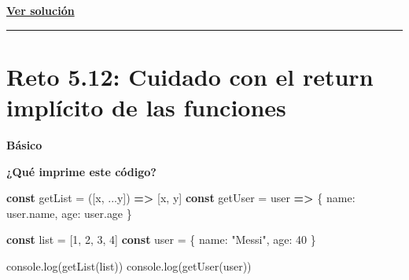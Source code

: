 \documentclass[
  letterpaper,
  DIV=11,
  numbers=noendperiod]{scrreprt}
\newenvironment{Shaded}{\begin{snugshade}}{\end{snugshade}}
\newcommand{\AttributeTok}[1]{\textcolor[rgb]{0.40,0.45,0.13}{#1}}
\newcommand{\BuiltInTok}[1]{\textcolor[rgb]{0.00,0.23,0.31}{#1}}
\newcommand{\DataTypeTok}[1]{\textcolor[rgb]{0.68,0.00,0.00}{#1}}
\newcommand{\DecValTok}[1]{\textcolor[rgb]{0.68,0.00,0.00}{#1}}
\newcommand{\FunctionTok}[1]{\textcolor[rgb]{0.28,0.35,0.67}{#1}}
\newcommand{\KeywordTok}[1]{\textcolor[rgb]{0.00,0.23,0.31}{\textbf{#1}}}
\newcommand{\NormalTok}[1]{\textcolor[rgb]{0.00,0.23,0.31}{#1}}
\newcommand{\OperatorTok}[1]{\textcolor[rgb]{0.37,0.37,0.37}{#1}}
\newcommand{\StringTok}[1]{\textcolor[rgb]{0.13,0.47,0.30}{#1}}
\begin{document}
\textbf{\hyperref[sec-sol-cap5-reto11]{Ver solución}}

\begin{center}\rule{0.5\linewidth}{0.5pt}\end{center}

\section{Reto 5.12: Cuidado con el return implícito de las
funciones}\label{sec-cap5-reto12}

\begin{tcolorbox}[enhanced jigsaw, left=2mm, toprule=.15mm, leftrule=.75mm, breakable, colback=white, coltitle=black, bottomtitle=1mm, arc=.35mm, rightrule=.15mm, colframe=quarto-callout-caution-color-frame, opacitybacktitle=0.6, toptitle=1mm, opacityback=0, titlerule=0mm, title=\textcolor{quarto-callout-caution-color}{\faFire}\hspace{0.5em}{Dificultad}, bottomrule=.15mm, colbacktitle=quarto-callout-caution-color!10!white]

\textbf{Básico}

\end{tcolorbox}

\textbf{¿Qué imprime este código?}

\begin{Shaded}
\begin{Highlighting}[]
\KeywordTok{const}\NormalTok{ getList }\OperatorTok{=}\NormalTok{ ([x}\OperatorTok{,} \OperatorTok{...}\NormalTok{y]) }\KeywordTok{=\textgreater{}}\NormalTok{ [x}\OperatorTok{,}\NormalTok{ y]}
\KeywordTok{const}\NormalTok{ getUser }\OperatorTok{=}\NormalTok{ user }\KeywordTok{=\textgreater{}}\NormalTok{ \{ }\DataTypeTok{name}\OperatorTok{:}\NormalTok{ user}\OperatorTok{.}\AttributeTok{name}\OperatorTok{,} \DataTypeTok{age}\OperatorTok{:}\NormalTok{ user}\OperatorTok{.}\AttributeTok{age}\NormalTok{ \}}

\KeywordTok{const}\NormalTok{ list }\OperatorTok{=}\NormalTok{ [}\DecValTok{1}\OperatorTok{,} \DecValTok{2}\OperatorTok{,} \DecValTok{3}\OperatorTok{,} \DecValTok{4}\NormalTok{]}
\KeywordTok{const}\NormalTok{ user }\OperatorTok{=}\NormalTok{ \{ }\DataTypeTok{name}\OperatorTok{:} \StringTok{"Messi"}\OperatorTok{,} \DataTypeTok{age}\OperatorTok{:} \DecValTok{40}\NormalTok{ \}}

\BuiltInTok{console}\OperatorTok{.}\FunctionTok{log}\NormalTok{(}\FunctionTok{getList}\NormalTok{(list))}
\BuiltInTok{console}\OperatorTok{.}\FunctionTok{log}\NormalTok{(}\FunctionTok{getUser}\NormalTok{(user))}
\end{Highlighting}
\end{Shaded}
\end{document}
